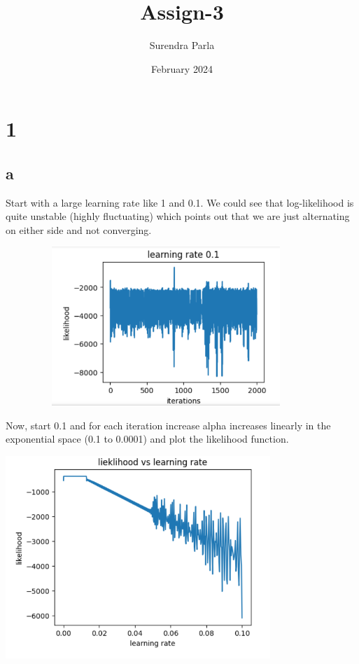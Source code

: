 \documentclass{article}
\title{Assign-3}
\author{Surendra Parla}
\date{February 2024}
\begin{document}
\maketitle

\section{1}
\subsection{a}
 Start with a large learning rate like 1 and 0.1. We could see that log-likelihood is quite unstable (highly fluctuating) which points out that we are just alternating on either side and not converging. 
 \begin{figure}[hp]
    \includegraphics[width=10cm, height=6cm]{image.png}
\end{figure}
    
Now, start 0.1 and for each iteration increase alpha increases linearly in the exponential space (0.1 to 0.0001) and plot the likelihood function.

    \includegraphics[width=10cm]{3-2.png}
\end{document}
